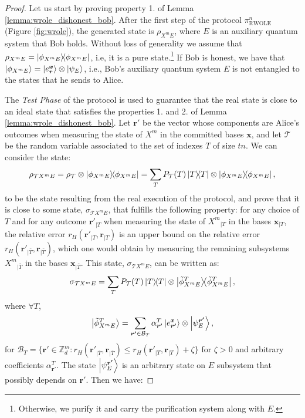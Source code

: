   
\begin{proof}


 Let us start by proving property 1. of Lemma \ref{lemma:wrole_dishonest_bob}.
After the first step of the protocol $\mathcal{\pi}^n_{\text{RWOLE}}$ (Figure \ref{fig:wrole}),  the generated state is $\rho_{X^m E}$, where $E$ is an auxiliary quantum system that Bob holds. Without loss of generality we assume that $\rho_{X^m E} = \ketbra{\phi_{X^m E}}$,   i.e, it is a pure state.\footnote{Otherwise, we purify it and carry the purification system along with $E$.} If Bob is honest, we have that $\ket{\phi_{X^m E}}=\ket{e^{\boldsymbol{x}}_{\boldsymbol{r}}}\otimes \ket{\psi_{E}}$, i.e.,   Bob's auxiliary quantum system $E$ is not entangled to the states that he sends to Alice.  

The \textit{Test Phase} of the protocol is used to guarantee that the real state is close to an ideal state that satisfies the properties 1. and 2. of Lemma \ref{lemma:wrole_dishonest_bob}. Let $\boldsymbol{r'}$ be the vector whose components are Alice's  outcomes when measuring the state of  $X^m$  in the committed bases $\bm{x}$, and let $\mathcal{T}$ be the random variable associated to the set of indexes $T$  of size $t n$. We can consider the state:
\begin{equation}
    \rho_{\mathcal{T}X^m E} = \rho_\mathcal{T}\otimes \ketbra{\phi_{X^m E}} = \sum_{T} P_\mathcal{T}(T) \ketbra{T}\otimes \ketbra{\phi_{X^m E}},
\label{eq:real_definition}
\end{equation}
to be the state resulting from the real execution of the protocol, and prove that it is close to some state, $\sigma_{\mathcal{T}X^m E}$, that fulfills the following property: for any choice of $T$ and for any outcome $\boldsymbol{r'}_{|T}$ when measuring the state of  ${X^m}_{|T}$ in the bases $\boldsymbol{x}_{|T}$, the relative error $r_H(\boldsymbol{r'}_{|T}, \boldsymbol{r}_{|T})$  is an upper bound on the relative error $r_H(\boldsymbol{r'}_{|\bar{T}}, \boldsymbol{r}_{|\bar{T}})$, which one would obtain by measuring the remaining subsystems ${X^m}_{|\bar{T}}$  in the bases $\boldsymbol{x}_{|\bar{T}}$. This state, $\sigma_{\mathcal{T}X^m E}$, can be  written as: 
\begin{equation}
\sigma_{\mathcal{T}X^m E} = \sum_{T} P_\mathcal{T}(T) \ketbra{T}\otimes \ketbra{\tilde{\phi}_{X^m E}^{T}},
\label{eq:ideal_definition}
\end{equation}
where $\forall T$, 
\begin{equation}
\ket{\tilde{\phi}_{X^m E}^{T}} = \sum_{\boldsymbol{r'}\in \mathcal{B}_{T}} \alpha_{\boldsymbol{r'}}^{T}\ket{e^{\boldsymbol{x}}_{\boldsymbol{r'}}}\otimes \ket{\psi^{\boldsymbol{r'}}_{E}},
\label{eq:ideal_definition_2}
\end{equation}
for  $\mathcal{B}_{T} = \{ \boldsymbol{r'}\in \mathbb{Z}_d^{m}: r_H(\boldsymbol{r'}_{|\bar{T}}, \boldsymbol{r}_{|\bar{T}})\leq r_H(\boldsymbol{r'}_{|T}, \boldsymbol{r}_{|T}) + \zeta \}$  for  $\zeta>0$ and arbitrary coefficients $\alpha^T_{\boldsymbol{r'}}$. The state $\ket{\psi^{\boldsymbol{r'}}_{E}}$ is an arbitrary state on $E$ subsystem that possibly depends on $\boldsymbol{r'}$. Then we have:


\end{proof}
